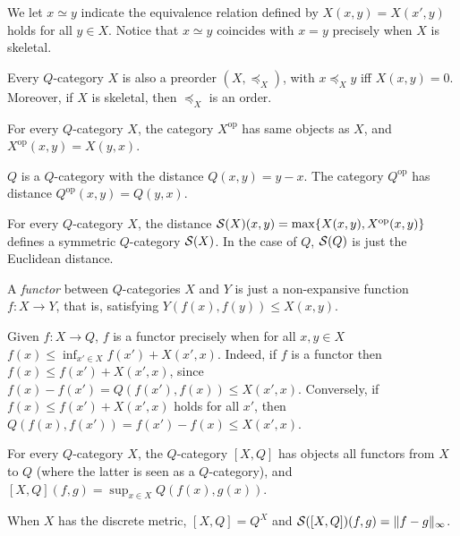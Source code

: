 We let $x\simeq y$ indicate the equivalence relation defined by  $X(x,y)=X(x',y)$ holds for all $y\in X$. 
Notice that $x\simeq y$ coincides with $x=y$ precisely when $X$ is skeletal.

Every $Q$-category $X$ is also a preorder $(X,\preceq_{X})$, with $x\preceq_{X}y$ iff $X(x,y)=0$. Moreover, if $X$ is skeletal, then $\preceq_{X}$ is an order.

For every $Q$-category $X$, the category $X^{\mathrm{op}}$ has same objects as $X$, and $X^{\mathrm{op}}(x,y)=X(y,x)$. 



\begin{example}
$Q$ is a $Q$-category with the distance $Q(x,y)=y-x$. 
The category $Q^{\mathrm{op}}$ has distance $Q^{\mathrm{op}}(x,y)=Q(y,x)$.
\end{example}

\begin{example}
For every $Q$-category $X$, the distance $\mathcal{S}(X)(x,y)=\max\{X(x,y),X^{\mathrm{op}}(x,y)\}$ defines a symmetric $Q$-category $\mathcal{S}(X)$. In the case of $Q$, $\mathcal{S}(Q)$ is just the Euclidean distance.
\end{example}






A \emph{functor} between $Q$-categories $X$ and $Y$ is just a non-expansive function $f:X\to Y$, that is, satisfying $Y(f(x),f(y))\leq X(x,y)$.

%
\begin{remark}\label{rem:functor}
Given $f:X\to Q$, $f$ is a functor precisely when for all $x,y\in X$ $f(x)\leq\inf_{x'\in X}f(x')+X(x',x)$. 
Indeed, if $f$ is a functor then $f(x)\leq f(x')+X(x',x)$, since $f(x)-f(x')=Q(f(x'),f(x))\leq X(x',x)$. 
Conversely, if $f(x)\leq f(x')+X(x',x)$ holds for all $x'$, then 
$Q(f(x),f(x'))=f(x')-f(x)\leq X(x',x)$. 
\end{remark}


\begin{example}
For every $Q$-category $X$, the $Q$-category $[X,Q]$ has objects all functors from $X$ to $Q$ (where the latter is seen as a $Q$-category), and $[X,Q](f,g)=\sup_{x\in X}Q(f(x),g(x))$.

When $X$ has the discrete metric, $[X,Q]=Q^{X}$ and $\mathcal{S}([X,Q])(f,g)=\| f-g\|_{\infty}$.

 
\end{example}


